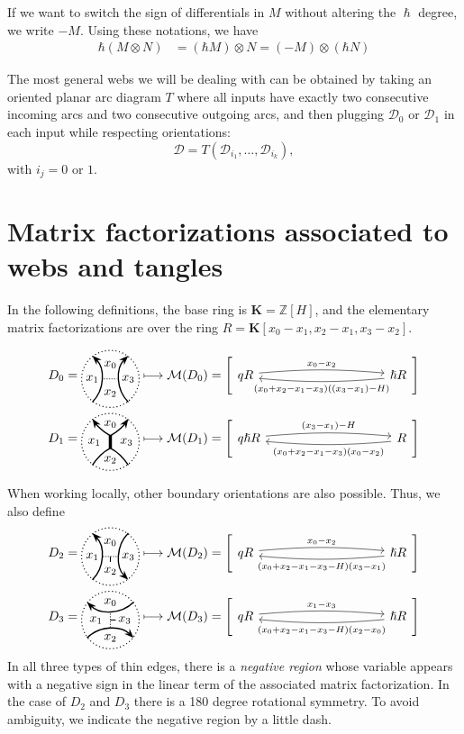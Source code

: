 \documentclass{article}
\newcommand{\Z}{\mathbb{Z}}
\newcommand{\DD}{\mathcal{D}}
\newcommand{\maf}{\mathcal{M}}
\newcommand{\mf}[4]{%
  \begin{tikzcd}[column sep=3.5cm, ampersand replacement=\&]
    {#1} \arrow[r, "#3", shift left=0.5ex, bend left=5,start anchor=east, end anchor=west] \arrow[r, leftarrow, "#4", shift right=0.5ex, bend right=5, swap, start anchor=east, end anchor=west] \& 
    {#2}
  \end{tikzcd}%
}
\theoremstyle{plain} %
\theoremstyle{definition} %
\theoremstyle{remark} %
\begin{document}
If we want to switch the sign of differentials in $M$ without altering the $\hslash$ degree, we write $-M$. Using these notations, we have 
\begin{align*}
    \hbar (M\otimes N) &= (\hbar M)\otimes N = (-M)\otimes(\hbar N)
\end{align*}



The most general webs we will be dealing with can be obtained by taking an oriented planar arc diagram $T$ where all inputs have exactly two consecutive incoming arcs and two consecutive outgoing arcs, and then plugging $\DD_0$ or $\DD_1$ in each input while respecting orientations:
$$\DD=T(\DD_{i_1},\dots,\DD_{i_k}),$$ 
with $i_j=0$ or $1$.

\section{Matrix factorizations associated to webs and tangles}
In the following definitions, the base ring is $\mathbf K=\Z[H]$, and the elementary matrix factorizations are over the ring $R=\mathbf K[x_0-x_1,x_2-x_1,x_3-x_2]$.

\begin{align*}
	D_0=\ThinEdgeStandard 
	&\longmapsto \maf(D_0)=\left[\mf{q R}{\hslash R}{x_0-x_2}{(x_0+x_2-x_1-x_3)((x_3-x_1)-H)}\right]
	\\
	D_1=\ThickEdgeStandard 
	&\longmapsto \maf(D_1)=\left[\mf{q \hslash R}{ R}{(x_3-x_1)-H}{(x_0+x_2-x_1-x_3)(x_0-x_2)}\right]
\end{align*}

When working locally, other boundary orientations are also possible. Thus, we also define
\begin{align*}
	D_2=\UnorientedHorizontalThinEdgeStandard 
	&
	\longmapsto \maf(D_2)=\left[\mf{q R}{\hslash R}{x_0-x_2}{(x_0+x_2-x_1-x_3-H)(x_3-x_1)}\right]
	\\
	D_3=\UnorientedVerticalThinEdgeStandard 
	&
	\longmapsto \maf(D_3)=\left[\mf{q R}{\hslash R}{x_1-x_3}{(x_0+x_2-x_1-x_3-H)(x_2-x_0)}\right]
\end{align*}
In all three types of thin edges, there is a \emph{negative region} whose variable appears with a negative sign in the linear term of the associated matrix factorization. In the case of $D_2$ and $D_3$ there is a 180 degree rotational symmetry. To avoid ambiguity, we indicate the negative region by a little dash.
\end{document}
